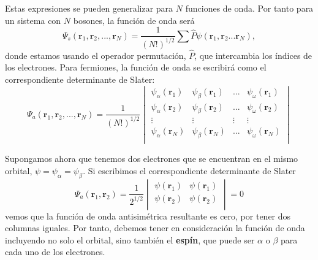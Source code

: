 \documentclass{tufte-handout}
\begin{document}
Estas expresiones se pueden generalizar para $N$ funciones de onda.
Por tanto para un sistema con $N$ bosones, la función de onda 
será
\begin{equation}
    \Psi_s(\mathbf{r}_1,\mathbf{r}_2, ..., \mathbf{r}_N) = \frac{1}{(N!)^{1/2}}
    \sum\hat{P}\psi(\mathbf{r}_1,\mathbf{r}_2 ... \mathbf{r}_N),
\end{equation}
donde estamos usando el operador permutación, $\hat{P}$, que
intercambia los índices de los electrones.
Para fermiones, la función de onda se escribirá como
el correspondiente determinante de Slater:
\begin{equation}
    \Psi_a(\mathbf{r}_1,\mathbf{r}_2, ..., \mathbf{r}_N) = \frac{1}{(N!)^{1/2}}
    \begin{vmatrix} 
    \psi_\alpha(\mathbf{r}_1) & \psi_\beta(\mathbf{r}_1) & ... & \psi_\omega(\mathbf{r}_1)  \\
    \psi_\alpha(\mathbf{r}_2) & \psi_\beta(\mathbf{r}_2) & ... & \psi_\omega(\mathbf{r}_2)  \\
    \vdots & \vdots & \vdots& \vdots\\
    \psi_\alpha(\mathbf{r}_N) & \psi_\beta(\mathbf{r}_N) & ... & \psi_\omega(\mathbf{r}_N)  \\
    \end{vmatrix}
\end{equation}

 
Supongamos ahora que tenemos dos electrones que se encuentran en el mismo
orbital, $\psi=\psi_\alpha = \psi_\beta$. Si escribimos el 
correspondiente determinante de Slater 
\begin{equation}
    \Psi_a(\mathbf{r}_1,\mathbf{r}_2) = \frac{1}{2^{1/2}}
    \begin{vmatrix} 
    \psi(\mathbf{r}_1) & \psi(\mathbf{r}_1)   \\
    \psi(\mathbf{r}_2) & \psi(\mathbf{r}_2)  \\
    \end{vmatrix}=0
\end{equation}
vemos que la función de onda antisimétrica resultante 
es cero, por tener dos columnas iguales. Por tanto, 
debemos tener en consideración
la función de onda incluyendo no solo el orbital,
sino también el \textbf{espín}, que puede ser $\alpha$
o $\beta$ para cada uno de los electrones. 
\end{document}
